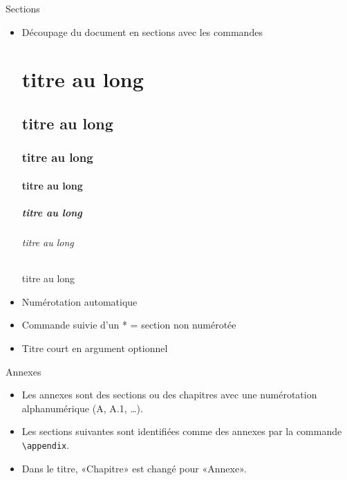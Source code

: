 \begin{frame}[fragile]{Sections}
	\begin{itemize}
		\item Découpage du document en sections avec les commandes
\begin{codesource}
	\part[titre court]{titre au long}
	\chapter[titre court]{titre au long}
	\section[titre court]{titre au long}
	\subsection[titre court]{titre au long}
	
	\subsubsection[titre court]{titre au long} 	%
	
	\paragraph[titre court]{titre au long} 		%
	\subparagraph[titre court]{titre au long} 	%
\end{codesource}

		\item Numérotation automatique
		\item Commande suivie d'un * = section non numérotée
		\item Titre court en argument optionnel
	\end{itemize}
\end{frame}

\begin{frame}[fragile,c]{Annexes}
	\begin{itemize}
		\item Les annexes sont des sections ou des chapitres avec une numérotation alphanumérique (A,
		A.1, \ldots).
		\item Les sections suivantes sont identifiées comme des annexes par la commande 
			\lstinline|\appendix|.
		\item Dans le titre, «Chapitre» est changé pour «Annexe».
	\end{itemize}
\end{frame}

